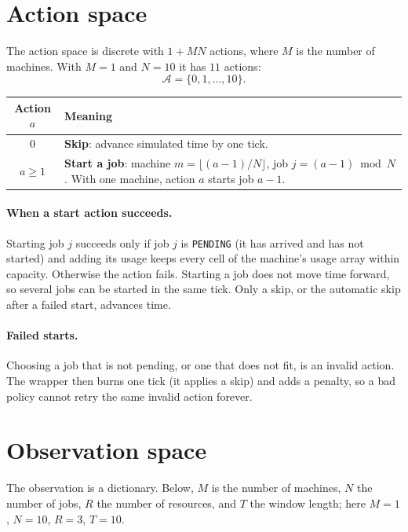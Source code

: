 \documentclass[11pt]{article}
\newcommand{\code}[1]{\texttt{#1}}
\newcommand{\N}{N}              %
\newcommand{\R}{R}              %
\newcommand{\Tw}{T}             %
\begin{document}
\section{Action space}

The action space is discrete with $1 + M\N$ actions, where $M$ is the number of machines. With $M=1$ and $\N=10$ it has $11$ actions:
\[
  \mathcal{A} = \{0, 1, \dots, 10\}.
\]

\begin{center}
\begin{tabular}{@{}cp{9.5cm}@{}}
\toprule
Action $a$ & Meaning \\
\midrule
$0$ & \textbf{Skip}: advance simulated time by one tick. \\
$a \ge 1$ & \textbf{Start a job}: machine $m=\lfloor (a-1)/\N \rfloor$, job $j=(a-1) \bmod \N$. With one machine, action $a$ starts job $a-1$. \\
\bottomrule
\end{tabular}
\end{center}

\paragraph{When a start action succeeds.} Starting job $j$ succeeds only if job $j$ is \code{PENDING} (it has arrived and has not started) and adding its usage keeps every cell of the machine's usage array within capacity. Otherwise the action fails. Starting a job does not move time forward, so several jobs can be started in the same tick. Only a skip, or the automatic skip after a failed start, advances time.

\paragraph{Failed starts.} Choosing a job that is not pending, or one that does not fit, is an invalid action. The wrapper then burns one tick (it applies a skip) and adds a penalty, so a bad policy cannot retry the same invalid action forever.

\section{Observation space}

The observation is a dictionary. Below, $M$ is the number of machines, $\N$ the number of jobs, $\R$ the number of resources, and $\Tw$ the window length; here $M=1$, $\N=10$, $\R=3$, $\Tw=10$.
\end{document}
